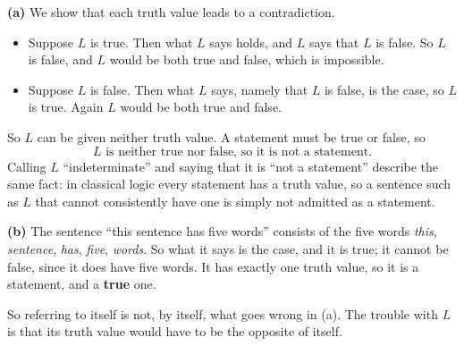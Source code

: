 \textbf{(a)} We show that each truth value leads to a contradiction.
\begin{itemize}
\item Suppose $L$ is true. Then what $L$ says holds, and $L$ says that $L$ is false. So $L$ is false, and $L$ would be both true and false, which is impossible.
\item Suppose $L$ is false. Then what $L$ says, namely that $L$ is false, is the case, so $L$ is true. Again $L$ would be both true and false.
\end{itemize}
So $L$ can be given neither truth value. A statement must be true or false, so
\[\boxed{L\text{ is neither true nor false, so it is not a statement.}}\]
Calling $L$ ``indeterminate'' and saying that it is ``not a statement'' describe the same fact: in classical logic every statement has a truth value, so a sentence such as $L$ that cannot consistently have one is simply not admitted as a statement.

\textbf{(b)} The sentence ``this sentence has five words'' consists of the five words \emph{this}, \emph{sentence}, \emph{has}, \emph{five}, \emph{words}. So what it says is the case, and it is true; it cannot be false, since it does have five words. It has exactly one truth value, so it is a statement, and a \textbf{true} one.

So referring to itself is not, by itself, what goes wrong in (a). The trouble with $L$ is that its truth value would have to be the opposite of itself.
